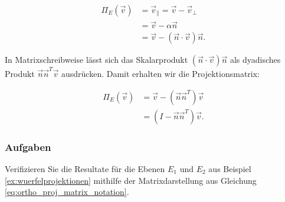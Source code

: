 \begin{align} \label{eq:projectionwithvectorandnormal}
    \Pi_{E}(\vec{v}) &= \vec{v}_{\parallel} = \vec{v} - \vec{v}_{\perp} \nonumber \\
    &= \vec{v} - \alpha \vec{n} \nonumber \\
    &= \vec{v} - (\vec{n} \cdot \vec{v}) \vec{n}.
\end{align}



In Matrixschreibweise lässt sich das Skalarprodukt $(\vec{n} \cdot \vec{v})\vec{n}$ als dyadisches Produkt $\vec{n}\vec{n}^T \vec{v}$ ausdrücken. Damit erhalten wir die Projektionsmatrix:

\begin{align} \label{eq:ortho_proj_matrix_notation}
    \Pi_{E}(\vec{v}) &= \vec{v} - (\vec{n}\vec{n}^T) \vec{v} \nonumber \\
    &= (I - \vec{n}\vec{n}^T) \vec{v}.
\end{align}

\subsubsection{Aufgaben}
\begin{exercise} \label{ex:verifizierungwuerfelprojektion}
Verifizieren Sie die Resultate für die Ebenen $E_1$ und $E_2$ aus Beispiel \ref{ex:wuerfelprojektionen} mithilfe der Matrixdarstellung aus Gleichung \eqref{eq:ortho_proj_matrix_notation}.
\end{exercise}